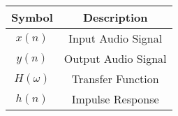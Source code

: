 \begin{tabular}{|c|c|}
\hline
  \textbf{Symbol} & \textbf{Description} \\
\hline
   $x(n)$  & Input Audio Signal \\
\hline
   $y(n)$  & Output Audio Signal \\
\hline
   $H(\omega)$ & Transfer Function \\
\hline
    $h(n)$ & Impulse Response\\
\hline
\end{tabular}
